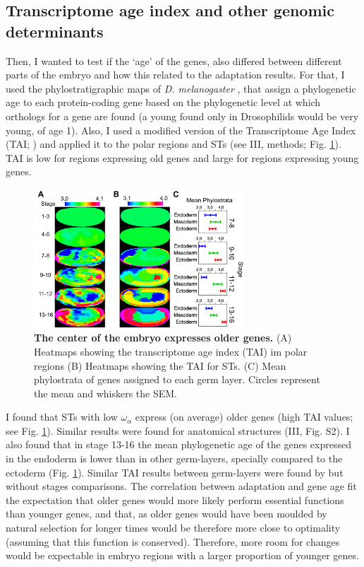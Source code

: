 \subsection{Transcriptome age index and other genomic determinants}
Then, I wanted to test if the `age' of the genes, also differed between different parts of the embryo and how this related to the adaptation results. For that, I used the phylostratigraphic maps of \textit{D. melanogaster} \citep{Drost2015}, that assign a phylogenetic age to each protein-coding gene based on the phylogenetic level at which orthologs for a gene are found (a young found only in Drosophilids would be very young, of age 1). Also, I used a modified version of the Transcriptome Age Index (TAI; \citealp{Domazet-Loso2010}) and applied it to the polar regions and STs (see III, methods; Fig. \ref{fig:Art-III-TAI}). TAI is low for regions expressing old genes and large for regions expressing young genes.
%
\begin{figure}[t]
  \includegraphics[width=0.7\textwidth]{./Images/Art-III/TAI.png}
  \centering
  \caption{\textbf{The center of the embryo expresses older genes.}
   (A) Heatmaps showing the transcriptome age index (TAI) im polar regions (B) Heatmaps showing the TAI for STs. (C) Mean phylostrata of genes assigned to each germ layer. Circles represent the mean and whiskers the SEM.
  }
  \label{fig:Art-III-TAI}
\end{figure}
%
I found that STs with low $\omega_{\alpha}$ express (on average) older genes (high TAI values; see Fig. \ref{fig:Art-III-TAI}). Similar results were found for anatomical structures (III, Fig. S2).
%
I also found that in stage 13-16 the mean phylogenetic age of the genes expressed in the endoderm is lower than in other germ-layers, specially compared to the ectoderm (Fig. \ref{fig:Art-III-TAI}).
Similar TAI results between germ-layers were found by \citet{Domazet-Loso2007} but without stages comparisons.
The correlation between adaptation and gene age fit the expectation that older genes would more likely perform essential functions than younger genes, and that, as older genes would have been moulded by natural selection for longer times would be therefore more close to optimality (assuming that this function is conserved). Therefore, more room for changes would be expectable in embryo regions with a larger proportion of younger genes. 

